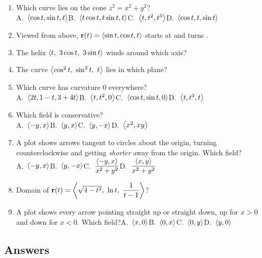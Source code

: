 \begin{enumerate}[label=\textbf{\arabic*.},start=6]
\item Which curve lies on the cone $z^2=x^2+y^2$?\\
  A.\ $\left\langle \cos t,\sin t,t \right\rangle$\quad B.\ $\left\langle t\cos t,t\sin t,t \right\rangle$\quad C.\ $\left\langle t,t^2,t^3 \right\rangle$\quad D.\ $\left\langle \cos t,t,\sin t \right\rangle$
\item Viewed from above, $\mathbf{r}(t)=\left\langle \sin t,\cos t,t \right\rangle$ starts at \underline{\hspace{2cm}} and turns
  \underline{\hspace{2.5cm}}.
\item The helix $\left\langle t,\ 3\cos t,\ 3\sin t \right\rangle$ winds around which axis?
\item The curve $\ip{\cos^2t,\ \sin^2t,\ t}$ lies in which plane?
\item Which curve has curvature $0$ everywhere?\\
  A.\ $\left\langle 2t,1-t,3+4t \right\rangle$\quad B.\ $\left\langle t,t^2,0 \right\rangle$\quad C.\ $\left\langle \cos t,\sin t,0 \right\rangle$\quad D.\ $\left\langle t,t^3,t \right\rangle$
\item Which field is conservative?\\
  A.\ $\left\langle -y,x \right\rangle$\quad B.\ $\left\langle y,x \right\rangle$\quad C.\ $\left\langle y,-x \right\rangle$\quad D.\ $\left\langle x^2,xy \right\rangle$
\item A plot shows arrows tangent to circles about the origin, turning counterclockwise and
  getting \emph{shorter} away from the origin. Which field?\\
  A.\ $\left\langle -y,x \right\rangle$\quad B.\ $\left\langle y,-x \right\rangle$\quad C.\ $\dfrac{\left\langle -y,x \right\rangle}{x^2+y^2}$\quad D.\ $\dfrac{\left\langle x,y \right\rangle}{x^2+y^2}$
\item Domain of $\vr(t)=\ip{\sqrt{4-t^2},\ \ln t,\ \dfrac1{t-1}}$?
\item A plot shows every arrow pointing straight up or straight down, up for $x>0$ and down for
  $x<0$. Which field?\quad A.\ $\left\langle x,0 \right\rangle$\quad B.\ $\left\langle 0,x \right\rangle$\quad C.\ $\left\langle 0,y \right\rangle$\quad D.\ $\left\langle y,0 \right\rangle$
\end{enumerate}

\subsection*{Answers}

